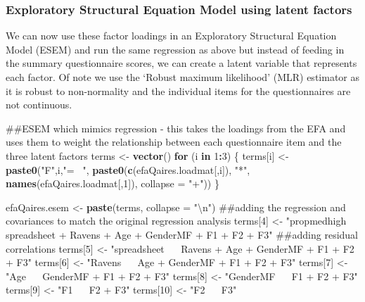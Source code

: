 \documentclass[]{article}
\newenvironment{Shaded}{\begin{snugshade}}{\end{snugshade}}
\newcommand{\KeywordTok}[1]{\textcolor[rgb]{0.13,0.29,0.53}{\textbf{#1}}}
\newcommand{\DataTypeTok}[1]{\textcolor[rgb]{0.13,0.29,0.53}{#1}}
\newcommand{\DecValTok}[1]{\textcolor[rgb]{0.00,0.00,0.81}{#1}}
\newcommand{\CharTok}[1]{\textcolor[rgb]{0.31,0.60,0.02}{#1}}
\newcommand{\StringTok}[1]{\textcolor[rgb]{0.31,0.60,0.02}{#1}}
\newcommand{\ControlFlowTok}[1]{\textcolor[rgb]{0.13,0.29,0.53}{\textbf{#1}}}
\newcommand{\OperatorTok}[1]{\textcolor[rgb]{0.81,0.36,0.00}{\textbf{#1}}}
\newcommand{\NormalTok}[1]{#1}
\begin{document}
\subsubsection{Exploratory Structural Equation Model using latent
factors}\label{exploratory-structural-equation-model-using-latent-factors}

We can now use these factor loadings in an Exploratory Structural
Equation Model (ESEM) and run the same regression as above but instead
of feeding in the summary questionnaire scores, we can create a latent
variable that represents each factor. Of note we use the `Robust maximum
likelihood' (MLR) estimator as it is robust to non-normality and the
individual items for the questionnaires are not continuous.

\begin{Shaded}
\begin{Highlighting}[]
\NormalTok{##ESEM which mimics regression - this takes the loadings from the EFA and uses them to weight the relationship between each questionnaire item and the three latent factors}
\NormalTok{terms <-}\StringTok{ }\KeywordTok{vector}\NormalTok{()}
\ControlFlowTok{for}\NormalTok{ (i }\ControlFlowTok{in} \DecValTok{1}\OperatorTok{:}\DecValTok{3}\NormalTok{) \{}
\NormalTok{  terms[i] <-}
\StringTok{    }\KeywordTok{paste0}\NormalTok{(}\StringTok{"F"}\NormalTok{,i,}\StringTok{"=~ "}\NormalTok{, }\KeywordTok{paste0}\NormalTok{(}\KeywordTok{c}\NormalTok{(efaQaires.loadmat[,i]), }\StringTok{"*"}\NormalTok{, }\KeywordTok{names}\NormalTok{(efaQaires.loadmat[,}\DecValTok{1}\NormalTok{]), }\DataTypeTok{collapse =} \StringTok{"+"}\NormalTok{))}
\NormalTok{\}}

\NormalTok{efaQaires.esem <-}\StringTok{ }\KeywordTok{paste}\NormalTok{(terms, }\DataTypeTok{collapse =} \StringTok{"}\CharTok{\textbackslash{}n}\StringTok{"}\NormalTok{)}
\NormalTok{##adding the regression and covariances to match the original regression analysis}
\NormalTok{terms[}\DecValTok{4}\NormalTok{] <-}\StringTok{ "propmedhigh ~ spreadsheet + Ravens + Age + GenderMF + F1 + F2 + F3"}
\NormalTok{##adding residual correlations}
\NormalTok{terms[}\DecValTok{5}\NormalTok{] <-}\StringTok{ "spreadsheet ~~ Ravens + Age + GenderMF + F1 + F2 + F3"}
\NormalTok{terms[}\DecValTok{6}\NormalTok{] <-}\StringTok{ "Ravens ~~ Age  + GenderMF + F1 + F2 + F3"}
\NormalTok{terms[}\DecValTok{7}\NormalTok{] <-}\StringTok{ "Age ~~  GenderMF + F1 + F2 + F3"}
\NormalTok{terms[}\DecValTok{8}\NormalTok{] <-}\StringTok{ "GenderMF ~~ F1 + F2 + F3"}
\NormalTok{terms[}\DecValTok{9}\NormalTok{] <-}\StringTok{ "F1 ~~ F2 + F3"}
\NormalTok{terms[}\DecValTok{10}\NormalTok{] <-}\StringTok{ "F2 ~~ F3"}


\end{Highlighting}
\end{Shaded}
\end{document}
